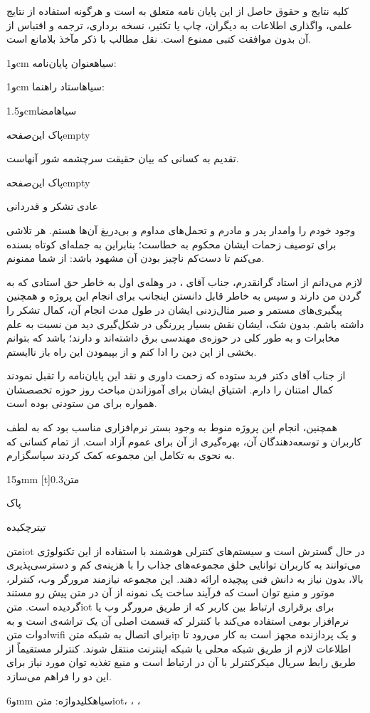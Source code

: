 کلیه نتایج و حقوق حاصل از این پايان نامه متعلق به \instfa است و هرگونه استفاده از نتایج علمی، واگذاری اطلاعات به دیگران، چاپ یا تکثیر، نسخه برداری، ترجمه و اقتباس از آن بدون موافقت کتبی \instfa ممنوع است. نقل مطالب با ذکر مآخذ بلامانع است.

‌و{1cm}
‌سیاه{عنوان پایان‌نامه}: \titlefa

‌و{1cm}
‌سیاه{استاد راهنما}:
\supervisorfa
{}


‌و{1.5cm}\authorfa{}‌سیاه{امضا}

‌پاک
‌این‌صفحه{empty}

 تقدیم به کسانی که بیان حقیقت سرچشمه شور آنهاست.

‌پاک
‌این‌صفحه{empty}

‌عادی تشکر و قدردانی


وجود خودم را وامدار پدر و مادرم و تحمل‌های مداوم و بی‌دریغ آن‌ها هستم. هر تلاشی برای توصیف زحمات ایشان محکوم به خطاست؛ بنابراین به جمله‌ای کوتاه بسنده می‌کنم تا دست‌کم ناچیز بودن آن مشهود باشد: از شما ممنونم.

لازم می‌دانم از استاد گرانقدرم، جناب آقای \supervisorfa، در وهله‌ی اول به خاطر حق استادی که به گردن من دارند و سپس به خاطر قابل دانستن اینجانب برای انجام این پروژه و همچنین پیگیری‌های مستمر و صبر مثال‌زدنی ایشان در طول مدت انجام آن، کمال تشکر را داشته باشم. بدون شک، ایشان نقش بسیار پررنگی در شکل‌گیری دید من نسبت به علم مخابرات و به طور کلی در حوزه‌ی مهندسی برق داشته‌اند و دارند؛ باشد که بتوانم بخشی از این دین را ادا کنم و از بپیمودن این راه باز ناایستم.

از جناب آقای دکتر فربد ستوده که زحمت داوری و نقد این پایان‌نامه را تقبل نمودند کمال امتنان را دارم. اشتیاق ایشان برای آموزاندن مباحث روز حوزه تخصصشان همواره برای من ستودنی بوده است.

همچنین، انجام این پروژه منوط به وجود بستر نرم‌افزاری مناسب بود که به لطف کاربران و توسعه‌دهندگان آن، بهره‌گیری از آن برای عموم آزاد است. از تمام کسانی که به نحوی به تکامل این مجموعه کمک کردند سپاسگزارم.

‌و{15mm}
[t]{0.3‌متن}
\authorfa\par\datefa
{}

‌پاک

‌تیتر{چکیده}

‌متن{iot} در حال گسترش است و سیستم‌های کنترلی هوشمند با استفاده از این تکنولوژی می‌توانند به کاربران توانایی خلق مجموعه‌های جذاب را با هزینه‌ی کم و دسترسی‌پذیری بالا، بدون نیاز به دانش فنی پیچیده ارائه دهند. این مجموعه‌ نیازمند مرورگر وب، کنترلر، موتور  و منبع توان است که فرآیند ساخت یک نمونه از آن در متن پیش رو مستند گردیده است. ‌متن{iot} برای برقراری ارتباط بین کاربر که از طریق مرورگر وب یا نرم‌افزار بومی استفاده می‌کند با کنترلر که قسمت اصلی آن یک تراشه‌ی  است و به ادوات ‌متن{wifi} برای اتصال به شبکه ‌متن{ip} و یک پردازنده مجهز است به کار می‌رود تا اطلاعات لازم از طریق شبکه محلی یا شبکه اینترنت منتقل شوند. کنترلر مستقیماً از طریق رابط سریال میکرکنترلر با آن در ارتباط است و منبع تغذیه توان مورد نیاز برای این دو را فراهم می‌سازد.

‌و{6mm}
‌سیاه{کلیدواژه}:
‌متن{iot}،
،
،

